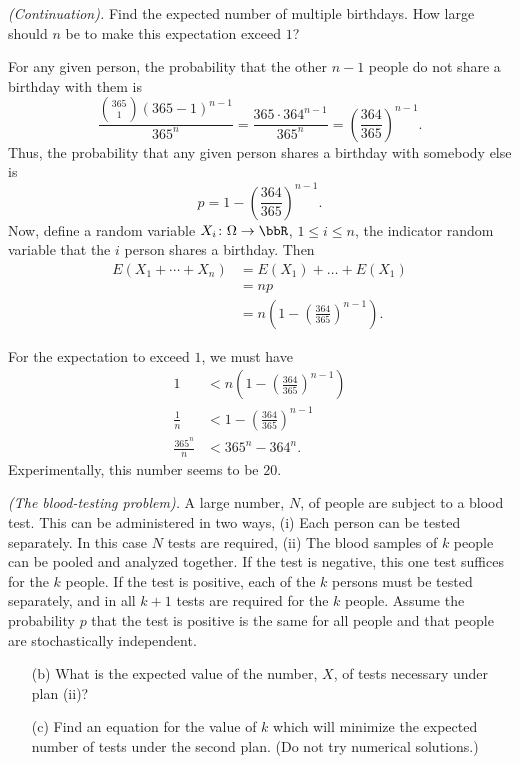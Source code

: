 \begin{problem}[Handout 6, \# 11]
  \emph{(Continuation).} Find the expected number of multiple
  birthdays. How large should \(n\) be to make this expectation exceed
  \(1\)?
\end{problem}
\begin{solution}
  For any given person, the probability that the other \(n-1\) people do
  not share a birthday with them is
  \[
    \frac{\binom{365}{1}(365-1)^{n-1}}{365^n}=\frac{365\cdot 364^{n-1}}{365^n}
    =\left(\frac{364}{365}\right)^{n-1}.
  \]
  Thus, the probability that any given person shares a birthday with
  somebody else is
  \[
    p=1-\left(\frac{364}{365}\right)^{n-1}.
  \]
  Now, define a random variable \(X_i\colon\Omega\to\bbR\),
  \(1\leq i\leq n\), the indicator random variable that the
  \(i\) person shares a birthday. Then
  \begin{align*}
    E(X_1+\dotsb+X_n)
    &=E(X_1)+\dotsc+E(X_1)\\
    &=n p\\
    &=n\left(1-\left(\frac{364}{365}\right)^{n-1}\right).
  \end{align*}

  For the expectation to exceed \(1\), we must have
  \begin{align*}
    1
    &<n\left(1-\left(\frac{364}{365}\right)^{n-1}\right)\\
    \frac{1}{n}&<1-\left(\frac{364}{365}\right)^{n-1}\\
    \frac{365^n}{n}&<365^n-364^n.
  \end{align*}
  Experimentally, this number seems to be \(20\).
\end{solution}
\newpage

\begin{problem}[Handout 6, \# 12]
  \emph{(The blood-testing problem).} A large number, \(N\), of people are
  subject to a blood test. This can be administered in two ways, (i) Each
  person can be tested separately. In this case \(N\) tests are required,
  (ii) The blood samples of \(k\) people can be pooled and analyzed
  together. If the test is negative, this one test suffices for the \(k\)
  people. If the test is positive, each of the \(k\) persons must be tested
  separately, and in all \(k+1\) tests are required for the \(k\)
  people. Assume the probability \(p\) that the test is positive is the
  same for all people and that people are stochastically independent.
  \begin{itemize}[noitemsep]
  \item[(b)] What is the expected value of the number, \(X\), of tests
    necessary under plan (ii)?
  \item[(c)] Find an equation for the value of \(k\) which will minimize
    the expected number of tests under the second plan. (Do not try
    numerical solutions.)
  \end{itemize}
  \end{problem}
\begin{solution}

\end{solution}
\newpage

